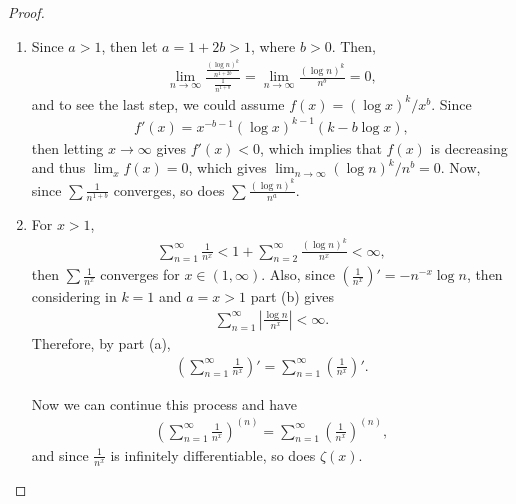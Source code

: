 \documentclass[11pt]{article}
\theoremstyle{definition}
\numberwithin{equation}{subsection}
\begin{document}
\begin{proof}
\begin{enumerate}[label=(\alph*)]
    \item Since $a > 1$, then let $a = 1 + 2b > 1$, where $b > 0$. Then,
    \begin{align*}
        \lim_{n\to\infty} \frac{\frac{(\log n)^k}{n^{1+2b}}}{\frac{1}{n^{1+b}}} = \lim_{n\to\infty} \frac{(\log n)^k}{n^b} = 0,
    \end{align*}
    and to see the last step, we could assume $f(x) = (\log x)^k / x^b$. Since 
    \begin{align*}
        f'(x) = x^{-b-1} (\log x)^{k-1} (k - b \log x),
    \end{align*}
    then letting $x \to \infty$ gives $f'(x) < 0$, which implies that $f(x)$ is decreasing and thus $\lim_{x} f(x) = 0$, which gives $\lim_{n\to\infty} (\log n)^k / n^b = 0$. Now, since $\displaystyle \sum \frac{1}{n^{1+b}}$ converges, so does $\displaystyle \sum \frac{(\log n)^k}{n^a}$.
    
    \item For $x > 1$, 
    \begin{align*}
        \sum^\infty_{n=1} \frac{1}{n^x} < 1 + \sum^\infty_{n=2} \frac{(\log n)^k}{n^x} < \infty,
    \end{align*}
    then $\displaystyle \sum \frac{1}{n^x}$ converges for $x \in (1, \infty)$. Also, since $\displaystyle \left(\frac{1}{n^x}\right)' = - n^{-x} \log n$, then considering in $k = 1$ and $a = x > 1$ part (b) gives
    \begin{align*}
        \sum^\infty_{n=1} \left|\frac{\log n}{n^x} \right| < \infty.
    \end{align*}
    Therefore, by part (a),
    \begin{align*}
        \left(\sum^\infty_{n=1} \frac{1}{n^x}\right)' = \sum^\infty_{n=1} \left(\frac{1}{n^x}\right)'.
    \end{align*}
    
    Now we can continue this process and have
    \begin{align*}
        \left(\sum^\infty_{n=1} \frac{1}{n^x}\right)^{(n)} = \sum^\infty_{n=1} \left(\frac{1}{n^x}\right)^{(n)},
    \end{align*}
    and since $\displaystyle \frac{1}{n^x}$ is infinitely differentiable, so does $\zeta(x)$.
\end{enumerate}
\end{proof}

\medskip
\end{document}
